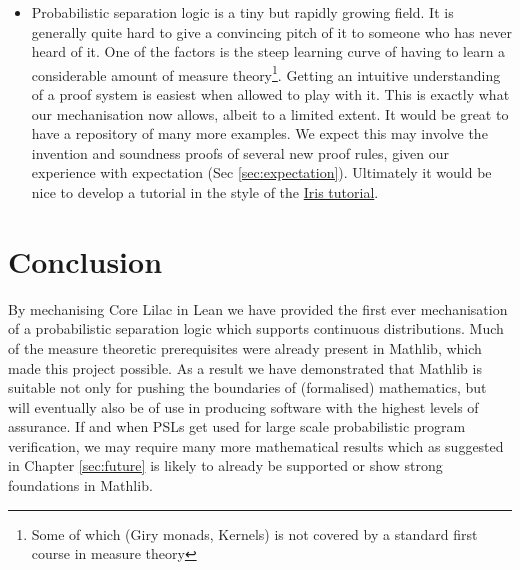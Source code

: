 \begin{itemize}
The reason for doing so is to get these proofs merged into Mathlib. The measure theory proofs don't really belong in this repo and likely would not be reviewed by the Iris-lean maintainers.
Such a generalisation may be harder than our current proof, but at the very least requires a rewrite of the relevant proofs. The second step is to condense and clarify the remaining Lilac repository, and attempt to have it
merged into Iris-lean\footnote{Guidelines for proof quality are that each line of proof should represent some idea like a line of a pen-paper proof}.
\item Probabilistic separation logic is a tiny but rapidly growing field. It is generally quite hard to give a convincing pitch of it to someone who has never heard of it. One of the factors is the steep
learning curve of having to learn a considerable amount of measure theory\footnote{Some of which (Giry monads, Kernels) is not covered by a standard first course in measure theory}. Getting an intuitive understanding of a proof system is easiest when allowed to play with it. This is exactly what our mechanisation
now allows, albeit to a limited extent. It would be great to have a repository of many more examples. We expect this may involve the invention and soundness proofs of several new proof rules, given our experience with expectation (Sec \ref{sec:expectation}).
Ultimately it would be nice to develop a tutorial in the style of the \href{https://github.com/logsem/iris-tutorial/}{Iris tutorial}.
\end{itemize}

\section{Conclusion}
By mechanising Core Lilac in Lean we have provided the first ever mechanisation of a probabilistic separation logic which supports continuous distributions. Much of the measure theoretic
prerequisites were already present in Mathlib, which made this project possible. As a result we have demonstrated that Mathlib is suitable not only for pushing the boundaries
of (formalised) mathematics, but will eventually also be of use in producing software with the highest levels of assurance. If and when PSLs get used for large scale probabilistic program verification,
we may require many more mathematical results which as suggested in Chapter \ref{sec:future} is likely to already be supported or show strong foundations in Mathlib.

